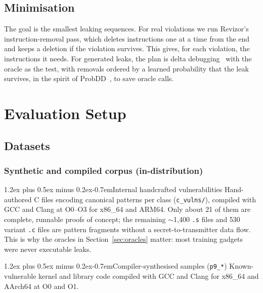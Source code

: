 \documentclass[conference]{IEEEtran}
\makeatletter
\renewcommand\paragraph{\@startsection{paragraph}{4}{\z@}%
  {1.2ex plus 0.5ex minus 0.2ex}{-0.7em}{\normalfont\normalsize\bfseries}}
\makeatother
\begin{document}

\subsection{Minimisation}
\label{sec:mindesign}
The goal is the smallest leaking sequences. For real violations we run
Revizor's instruction-removal pass, which deletes instructions one at a time
from the end and keeps a deletion if the violation survives. This gives, for
each violation, the instructions it needs. For generated leaks, the plan is
delta debugging~\cite{ddmin} with the oracle as the test, with removals
ordered by a learned probability that the leak survives, in the spirit of
ProbDD~\cite{probdd}, to save oracle calls.


\section{Evaluation Setup}
\label{sec:experiments}

\subsection{Datasets}
\label{sec:data}

\subsubsection{Synthetic and compiled corpus (in-distribution)}
\label{sec:data-synth}

\paragraph{Internal handcrafted vulnerabilities}
Hand-authored C files encoding canonical patterns per class
(\texttt{c\_vulns/}), compiled with GCC and Clang at O0--O3 for x86\_64 and
ARM64. Only about 21 of them are complete, runnable proofs of concept; the
remaining $\sim$1,400 \texttt{.s} files and 530 variant \texttt{.c} files are
pattern fragments without a secret-to-transmitter data flow. This is why the
oracles in Section~\ref{sec:oracles} matter: most training gadgets were never
executable leaks.

\paragraph{Compiler-synthesised samples (\texttt{p9\_*})}
Known-vulnerable kernel and library code compiled with GCC and Clang for
x86\_64 and AArch64 at O0 and O1.
\end{document}
